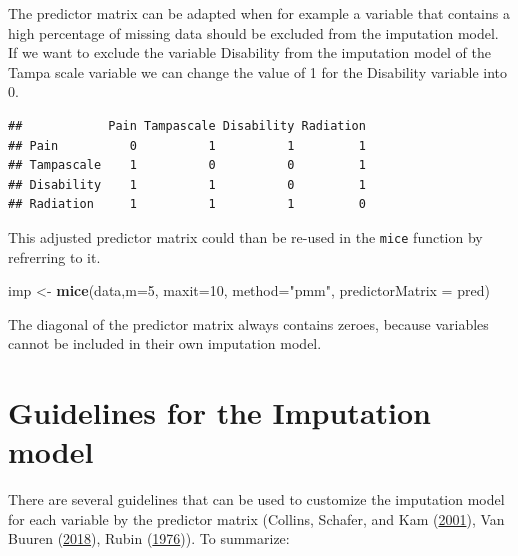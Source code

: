 \documentclass[
]{book}
\newenvironment{Shaded}{\begin{snugshade}}{\end{snugshade}}
\newcommand{\DataTypeTok}[1]{\textcolor[rgb]{0.13,0.29,0.53}{#1}}
\newcommand{\DecValTok}[1]{\textcolor[rgb]{0.00,0.00,0.81}{#1}}
\newcommand{\KeywordTok}[1]{\textcolor[rgb]{0.13,0.29,0.53}{\textbf{#1}}}
\newcommand{\NormalTok}[1]{#1}
\newcommand{\OperatorTok}[1]{\textcolor[rgb]{0.81,0.36,0.00}{\textbf{#1}}}
\newcommand{\StringTok}[1]{\textcolor[rgb]{0.31,0.60,0.02}{#1}}
\begin{document}
The predictor matrix can be adapted when for example a variable that
contains a high percentage of missing data should be excluded from the
imputation model. If we want to exclude the variable Disability from the
imputation model of the Tampa scale variable we can change the value of
1 for the Disability variable into 0.

\begin{Shaded}
\end{Shaded}

\begin{verbatim}
##            Pain Tampascale Disability Radiation
## Pain          0          1          1         1
## Tampascale    1          0          0         1
## Disability    1          1          0         1
## Radiation     1          1          1         0
\end{verbatim}

This adjusted predictor matrix could than be re-used in the
\texttt{mice} function by refrerring to it.

\begin{Shaded}
\begin{Highlighting}[]
\NormalTok{imp <-}\StringTok{ }\KeywordTok{mice}\NormalTok{(data,}\DataTypeTok{m=}\DecValTok{5}\NormalTok{, }\DataTypeTok{maxit=}\DecValTok{10}\NormalTok{, }\DataTypeTok{method=}\StringTok{"pmm"}\NormalTok{, }\DataTypeTok{predictorMatrix =}\NormalTok{ pred)}
\end{Highlighting}
\end{Shaded}

The diagonal of the predictor matrix always contains zeroes, because
variables cannot be included in their own imputation model.

\hypertarget{guidelines-for-the-imputation-model}{%
\section{Guidelines for the Imputation
model}\label{guidelines-for-the-imputation-model}}

There are several guidelines that can be used to customize the
imputation model for each variable by the predictor matrix (Collins,
Schafer, and Kam (\protect\hyperlink{ref-Collins2001}{2001}), Van Buuren
(\protect\hyperlink{ref-VanBuuren2018}{2018}), Rubin
(\protect\hyperlink{ref-Rubin1976}{1976})). To summarize:
\end{document}
